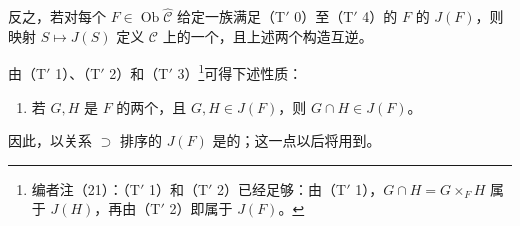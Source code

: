 反之，若对每个 $F\in\operatorname{Ob}\widehat{\mathcal C}$ 给定一族满足（T$'$ 0）至（T$'$ 4）的 $F$ 的 $J(F)$，则映射 $S\mapsto J(S)$ 定义 $\mathcal C$ 上的一个，且上述两个构造互逆。

由（T$'$ 1）、（T$'$ 2）和（T$'$ 3）\footnote{编者注（21）：（T$'$ 1）和（T$'$ 2）已经足够：由（T$'$ 1），$G\cap H=G\times_F H$ 属于 $J(H)$，再由（T$'$ 2）即属于 $J(F)$。}可得下述性质：
\begin{enumerate}
\item[（T$'$ 5）] 若 $G,H$ 是 $F$ 的两个，且 $G,H\in J(F)$，则 $G\cap H\in J(F)$。
\end{enumerate}
因此，以关系 $\supset$ 排序的 $J(F)$ 是的；这一点以后将用到。

